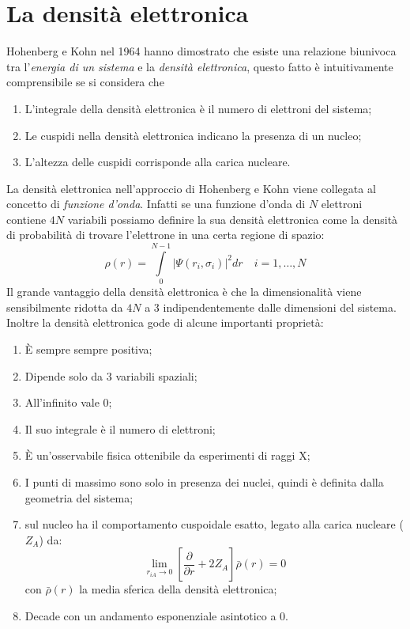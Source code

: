 \documentclass[oneside]{amsbook}
\numberwithin{section}{chapter}
\numberwithin{equation}{section}
\numberwithin{figure}{section}
\begin{document}
\section{La densità elettronica }
Hohenberg e Kohn nel 1964 hanno dimostrato che esiste una relazione biunivoca tra l'\emph{energia di un sistema} e la \emph{densità elettronica}, questo fatto è intuitivamente comprensibile se si considera che
\begin{enumerate}
\item L'integrale della densità elettronica è il  numero di elettroni del sistema;
\item Le cuspidi nella densità elettronica indicano la presenza di un nucleo;
\item L'altezza delle cuspidi corrisponde alla carica nucleare.
\end{enumerate}
La densità elettronica nell'approccio di Hohenberg e Kohn viene collegata al concetto di \emph{funzione d'onda}. Infatti se una funzione d'onda di $N$ elettroni contiene $4N$ variabili possiamo definire la sua densità elettronica come la densità di probabilità di trovare l'elettrone in una certa regione di spazio:
\begin{equation}
\rho(r) = \int \limits_0 ^{N-1} \vert \Psi(r_i, \sigma_i) \vert ^2 dr \quad i=1,\ldots, N
\end{equation}
Il grande vantaggio della densità elettronica è che la dimensionalità viene sensibilmente ridotta da $4N$ a $3$ indipendentemente dalle dimensioni del sistema.
Inoltre la densità elettronica gode di alcune importanti proprietà:
\begin{enumerate}
\item \`E sempre sempre positiva;
\item Dipende solo da 3 variabili spaziali;
\item All'infinito vale $0$;
\item Il suo integrale è il numero di elettroni;
\item È un'osservabile fisica ottenibile da esperimenti di raggi X;
\item I punti di massimo sono solo in presenza dei nuclei, quindi è definita dalla geometria del sistema;
\item sul nucleo ha il comportamento cuspoidale esatto, legato alla carica nucleare ($Z_A$) da: $$\lim_{r_{iA}\rightarrow 0}\left[ \frac{\partial}{\partial r}+2 Z_A \right] \bar{\rho}(r)=0 $$
con $\bar{\rho}(r)$ la media sferica della densità elettronica;
\item Decade con un andamento esponenziale asintotico a 0.
\end{enumerate}
\end{document}
